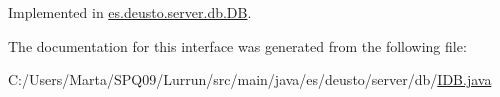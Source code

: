 Implemented in \hyperlink{classes_1_1deusto_1_1server_1_1db_1_1_d_b_ac85523faea523033439a932bbcab2c7e}{es.\+deusto.\+server.\+db.\+DB}.



The documentation for this interface was generated from the following file\+:\begin{DoxyCompactItemize}
\item 
C\+:/\+Users/\+Marta/\+S\+P\+Q09/\+Lurrun/src/main/java/es/deusto/server/db/\hyperlink{_i_d_b_8java}{I\+D\+B.\+java}\end{DoxyCompactItemize}

